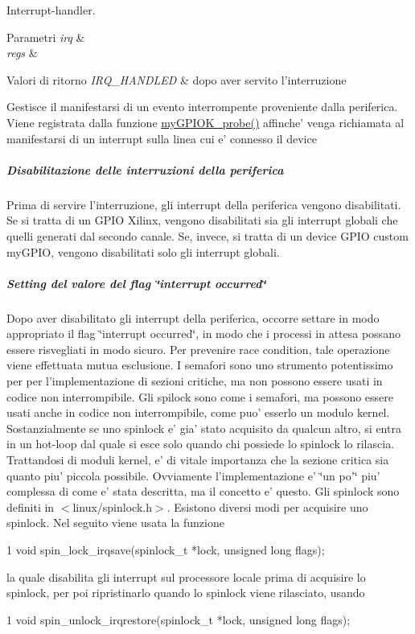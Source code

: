 Interrupt-\/handler. 


\begin{DoxyParams}{Parametri}
{\em irq} & \\
\hline
{\em regs} & \\
\hline
\end{DoxyParams}

\begin{DoxyRetVals}{Valori di ritorno}
{\em I\+R\+Q\+\_\+\+H\+A\+N\+D\+L\+E\+D} & dopo aver servito l'interruzione\\
\hline
\end{DoxyRetVals}
Gestisce il manifestarsi di un evento interrompente proveniente dalla periferica. Viene registrata dalla funzione \hyperlink{group___kernel-_module_gae40973a06d72f7c41a9af07513a62307}{my\+G\+P\+I\+O\+K\+\_\+probe()} affinche' venga richiamata al manifestarsi di un interrupt sulla linea cui e' connesso il device \subparagraph*{Disabilitazione delle interruzioni della periferica}

Prima di servire l'interruzione, gli interrupt della periferica vengono disabilitati. Se si tratta di un G\+P\+I\+O Xilinx, vengono disabilitati sia gli interrupt globali che quelli generati dal secondo canale. Se, invece, si tratta di un device G\+P\+I\+O custom my\+G\+P\+I\+O, vengono disabilitati solo gli interrupt globali.

\subparagraph*{Setting del valore del flag \char`\"{}interrupt occurred\char`\"{}}

Dopo aver disabilitato gli interrupt della periferica, occorre settare in modo appropriato il flag \char`\"{}interrupt occurred\char`\"{}, in modo che i processi in attesa possano essere risvegliati in modo sicuro. Per prevenire race condition, tale operazione viene effettuata mutua esclusione. I semafori sono uno strumento potentissimo per per l'implementazione di sezioni critiche, ma non possono essere usati in codice non interrompibile. Gli spilock sono come i semafori, ma possono essere usati anche in codice non interrompibile, come puo' esserlo un modulo kernel. Sostanzialmente se uno spinlock e' gia' stato acquisito da qualcun altro, si entra in un hot-\/loop dal quale si esce solo quando chi possiede lo spinlock lo rilascia. Trattandosi di moduli kernel, e' di vitale importanza che la sezione critica sia quanto piu' piccola possibile. Ovviamente l'implementazione e' \char`\"{}un po'\char`\"{} piu' complessa di come e' stata descritta, ma il concetto e' questo. Gli spinlock sono definiti in $<$linux/spinlock.\+h$>$. Esistono diversi modi per acquisire uno spinlock. Nel seguito viene usata la funzione 
\begin{DoxyCode}
1 void spin\_lock\_irqsave(spinlock\_t *lock, unsigned long flags);
\end{DoxyCode}
 la quale disabilita gli interrupt sul processore locale prima di acquisire lo spinlock, per poi ripristinarlo quando lo spinlock viene rilasciato, usando 
\begin{DoxyCode}
1 void spin\_unlock\_irqrestore(spinlock\_t *lock, unsigned long flags);
\end{DoxyCode}


